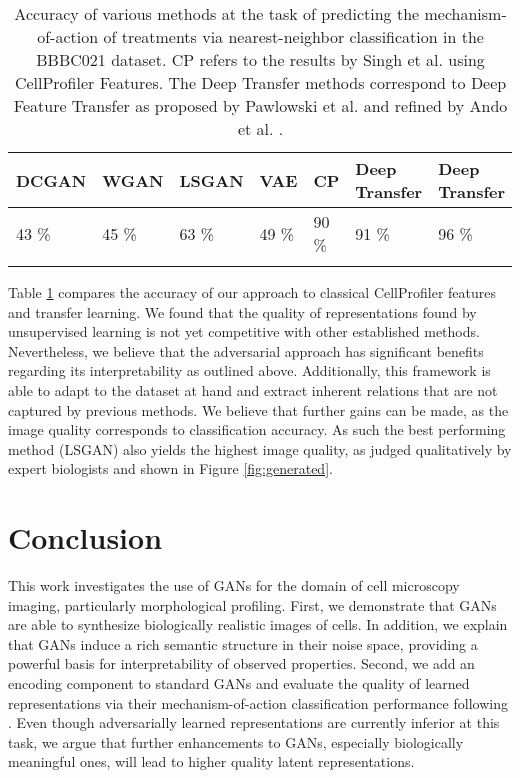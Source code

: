 \documentclass{article}
\begin{document}
\begin{table}
  \centering
  \begin{tabular}{lllllll}
  	\toprule
    DCGAN & WGAN & LSGAN & VAE \cite{pawlowski2016msc} & CP \cite{Singh2014} & Deep Transfer \cite{pawlowski2016automating}  & Deep Transfer \cite{ando2017improving} \\
    \midrule
    43 \%& 45 \% & 63 \% & 49 \% & 90 \% & 91 \% & 96 \% \\
    \bottomrule \\
  \end{tabular}
  \caption{Accuracy of various methods at the task of predicting the mechanism-of-action of treatments via nearest-neighbor classification in the BBBC021 dataset. CP refers to the results by Singh et al. \cite{Singh2014} using CellProfiler Features. The Deep Transfer methods correspond to Deep Feature Transfer as proposed by Pawlowski et al. \cite{pawlowski2016automating} and refined by Ando et al. \cite{ando2017improving}.}
  \label{moa-results}
\end{table}

Table \ref{moa-results} compares the accuracy of our approach to classical CellProfiler features and transfer learning. We found that the quality of representations found by unsupervised learning is not yet competitive with other established methods. Nevertheless, we believe that the adversarial approach has significant benefits regarding its interpretability as outlined above. Additionally, this framework is able to adapt to the dataset at hand and extract inherent relations that are not captured by previous methods. We believe that further gains can be made, as the image quality corresponds to classification accuracy. As such the best performing method (LSGAN) also yields the highest image quality, as judged qualitatively by expert biologists and shown in Figure \ref{fig:generated}.


\section{Conclusion}

This work investigates the use of GANs for the domain of cell microscopy
imaging, particularly morphological profiling. First, we demonstrate that GANs
are able to synthesize biologically realistic images of cells. In addition, we
explain that GANs induce a rich semantic structure in their noise space,
providing a powerful basis for interpretability of observed properties. Second,
we add an encoding component to standard GANs and evaluate the quality of
learned representations via their mechanism-of-action classification performance
following \cite{Ljosa2013}. Even though adversarially learned representations
are currently inferior at this task, we argue that further enhancements to GANs,
especially biologically meaningful ones, will lead to higher quality latent
representations.
\end{document}
